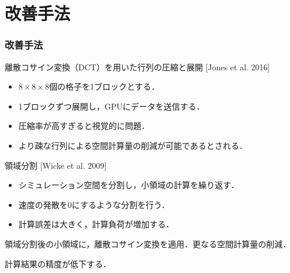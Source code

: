 \documentclass[aspectratio=169,dvipdfmx,hyperref={bookmarks=true}]{beamer}
\begin{document}
\section{改善手法}
\begin{frame}
\frametitle{改善手法}
\begin{block}{離散コサイン変換（DCT）を用いた行列の圧縮と展開\cite{subspaceDCT} [Jones et al. 2016] %
}
	\begin{itemize}
		\item $8\times8\times8$個の格子を1ブロックとする．
		\item 1ブロックずつ展開し，GPUにデータを送信する．
	\end{itemize}
	\begin{itemize}
		\item 圧縮率が高すぎると視覚的に問題．
		\item より疎な行列による空間計算量の削減が可能であるとされる．
	\end{itemize}
\end{block}

\begin{block}{領域分割\cite{tile}  [Wicke et al. 2009]}
	\begin{itemize}
		\item シミュレーション空間を分割し，小領域の計算を繰り返す．
		\item 速度の発散を0にするような分割を行う．
		\item 計算誤差は大きく，計算負荷が増加する．
	\end{itemize}
	
\end{block}
領域分割後の小領域に，離散コサイン変換を適用．更なる空間計算量の削減．

計算結果の精度が低下する．
 \end{frame}
\end{document}
